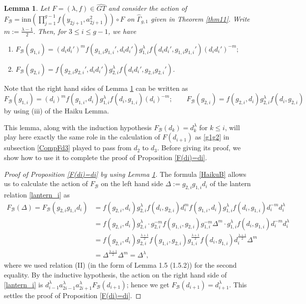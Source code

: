\documentclass[a4paper,10pt,reqno]{amsart}
\newcommand\FB{F_{\mathcal{B}}}
\newcommand\GT{\widehat{GT}}
\newcommand\GGone{\widehat{\Gamma}_{g,1}}
\newtheorem{lem}[thm]{Lemma}
\begin{document}
\begin{lem}
\label{GTaction_g1-g2}
Let $F=(\lambda,f)\in\GT$ and consider the action
of 
$\FB=\mathrm{inn}(\prod_{j=1}^{g-1} f(y_{2j+1},a_{2j+1}^2))\circ F$
on $\GGone$ given in Theorem \ref{thm11}.
Write $m:=\frac{\lambda-1}{2}$.
Then, for $3\le i\le g-1$, we have
\begin{enumerate}
\item[(i)] 
$\FB(g_{1,i})=(d_id_i')^m
f(g_{1,i}g_{1,i}',d_id_i')g_{1,i}^\lambda 
f(d_id_i',g_{1,i}g_{1,i}')(d_id_i')^{-m};$
\item[(ii)]
$\FB(g_{2,i})=f(g_{2,i}g_{2,i}',d_id_i')g_{2,i}^\lambda 
f(d_id_i',g_{2,i}g_{2,i}')$.
\end{enumerate}
\end{lem}

\noindent
Note that the right hand sides of
Lemma \ref{GTaction_g1-g2} can be written as
\begin{equation}
\label{HaikuB}
\FB(g_{1,i})=(d_i)^m
f(g_{1,i},d_i)g_{1,i}^\lambda 
f(d_i,g_{1,i})(d_i)^{-m}; \qquad
\FB(g_{2,i})=f(g_{2,i},d_i)g_{2,i}^\lambda 
f(d_i,g_{2,i})
\end{equation}
by using (iii) of the Haiku Lemma.

\vspace{.3cm}
This lemma, along with the induction hypothesis $\FB(d_k)=d_k^\lambda$
for $k\le i$, will play here exactly the same role 
in the calculation of $F(d_{i+1})$ as \eqref{g1g2} in subsection \ref{CompFd3}
played to pass from $d_2$ to $d_3$. Before giving its proof, we show how
to use it to complete the proof of Proposition \ref{F(di)=di}.

\begin{proof}[Proof of Proposition \ref{F(di)=di}
by using Lemma \ref{GTaction_g1-g2}]

The formula \eqref{HaikuB} allows us to calculate
the action of $\FB$ on the left hand side 
$\Delta:=g_{2,i}g_{1,i}d_i$ of the lantern relation \eqref{lantern_i} 
as
\begin{align*}
\FB(\Delta)=\FB(g_{2,i}g_{1,i}d_i)
&=
f(g_{2,i},d_i)g_{2,i}^\lambda f(d_i,g_{2,i})
d_i^m f(g_{1,i},d_i)g_{1,i}^\lambda f(d_i,g_{1,i})d_i^{-m}
d_i^\lambda \\
&=
f(g_{2,i},d_i)g_{2,i}^\lambda 
\cdot
g_{2,i}^{-m}f(g_{1,i}, g_{2,i}) g_{1,i}^{-m}\Delta^m 
\cdot
g_{1,i}^\lambda
f(d_i,g_{1,i})d_i^{-m}
d_i^\lambda 
\\
&=
f(g_{2,i},d_i)g_{2,i}^{\frac{\lambda+1}{2}}
f(g_{1,i}, g_{2,i}) g_{1,i}^{\frac{\lambda+1}{2}}
 f(d_i,g_{1,i})
d_i^{\frac{\lambda+1}{2}}
\Delta^m 
\\
&=
\Delta^{\frac{\lambda+1}{2}}\Delta^m =\Delta^\lambda,
\end{align*} 
where we used relation (II) 
(in the form of \cite{NS} Lemma 1.5 (1.5.2)) for the second equality.
By the inductive hypothesis, the action on the right hand side 
of \eqref{lantern_i} is $d_{i-1}^\lambda a_{2i-1}^\lambda
a_{2i+1}^\lambda \FB(d_{i+1})$; hence we get $\FB(d_{i+1})=d_{i+1}^\lambda$.
This settles the proof of Proposition
\ref{F(di)=di}. 
\end{proof}
\end{document}
